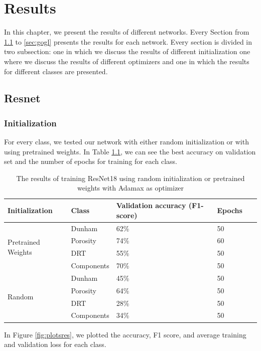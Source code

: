 \chapter{Results}\label{chp:results}

In this chapter, we present the results of different networks. Every Section from \ref{sec:res} to \ref{sec:gogl} presents the results for each network. Every section is divided in two subsection: one in which we discuss the results of different initialization one where we discuss the results of different optimizers and one in which the results for different classes are presented. 
\section{Resnet}\label{sec:res}
\subsection{Initialization}
For every class, we tested our network with either random initialization or with using pretrained weights. In Table \ref{tab:resinit}, we can see the best accuracy on validation set and the number of epochs for training for each class.  

\begin{table}
\caption{\label{tab:resinit} The results of training ResNet18 using random initialization or pretrained weights with Adamax as optimizer}
\centering
\begin{tabular}[b]{| l | l | l | l | l |}
\hline
    Initialization & Class & Validation accuracy (F1-score) & Epochs\ \\ \hline
    \multirow{4}{*}{Pretrained Weights} & Dunham &  62\%  & 50 \\ 
    & Porosity & 74\%  &  60 \\
    &DRT & 55\% &  50 \\
    &Components & 70\% &  50 \\ \hline
     \multirow{4}{*}{Random} & Dunham &  45\%  & 50 \\
    & Porosity & 64\% &  50 \\
    &DRT & 28\% & 50 \\
    &Components & 34\% &  50 \\ \hline
    
\end{tabular} 
\end{table}
In Figure \ref{fig:plotsres}, we plotted the accuracy, F1 score, and average training and validation loss for each class. 

